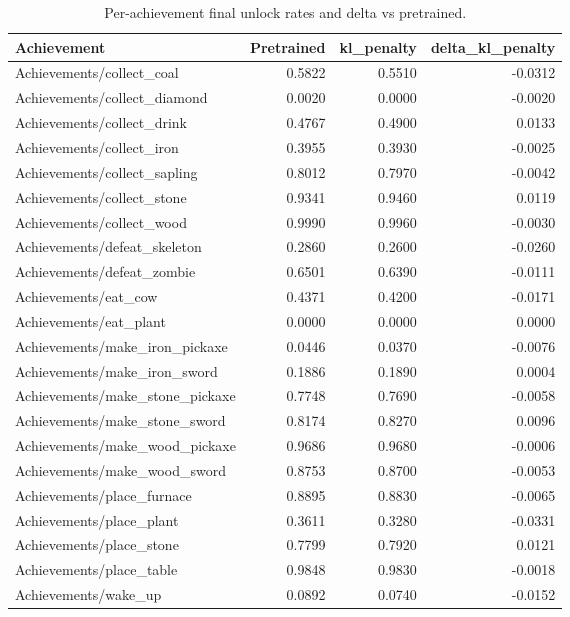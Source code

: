\begin{table}[htbp]
\centering
\caption{Per-achievement final unlock rates and delta vs pretrained.}
\label{tab:achievements}
\begin{tabular}{lrrr}
\toprule
\textbf{Achievement} & \textbf{Pretrained} & \textbf{kl\_penalty} & \textbf{delta\_kl\_penalty} \\
\midrule
Achievements/collect\_coal & 0.5822 & 0.5510 & -0.0312 \\
Achievements/collect\_diamond & 0.0020 & 0.0000 & -0.0020 \\
Achievements/collect\_drink & 0.4767 & 0.4900 & 0.0133 \\
Achievements/collect\_iron & 0.3955 & 0.3930 & -0.0025 \\
Achievements/collect\_sapling & 0.8012 & 0.7970 & -0.0042 \\
Achievements/collect\_stone & 0.9341 & 0.9460 & 0.0119 \\
Achievements/collect\_wood & 0.9990 & 0.9960 & -0.0030 \\
Achievements/defeat\_skeleton & 0.2860 & 0.2600 & -0.0260 \\
Achievements/defeat\_zombie & 0.6501 & 0.6390 & -0.0111 \\
Achievements/eat\_cow & 0.4371 & 0.4200 & -0.0171 \\
Achievements/eat\_plant & 0.0000 & 0.0000 & 0.0000 \\
Achievements/make\_iron\_pickaxe & 0.0446 & 0.0370 & -0.0076 \\
Achievements/make\_iron\_sword & 0.1886 & 0.1890 & 0.0004 \\
Achievements/make\_stone\_pickaxe & 0.7748 & 0.7690 & -0.0058 \\
Achievements/make\_stone\_sword & 0.8174 & 0.8270 & 0.0096 \\
Achievements/make\_wood\_pickaxe & 0.9686 & 0.9680 & -0.0006 \\
Achievements/make\_wood\_sword & 0.8753 & 0.8700 & -0.0053 \\
Achievements/place\_furnace & 0.8895 & 0.8830 & -0.0065 \\
Achievements/place\_plant & 0.3611 & 0.3280 & -0.0331 \\
Achievements/place\_stone & 0.7799 & 0.7920 & 0.0121 \\
Achievements/place\_table & 0.9848 & 0.9830 & -0.0018 \\
Achievements/wake\_up & 0.0892 & 0.0740 & -0.0152 \\
\bottomrule
\end{tabular}
\end{table}